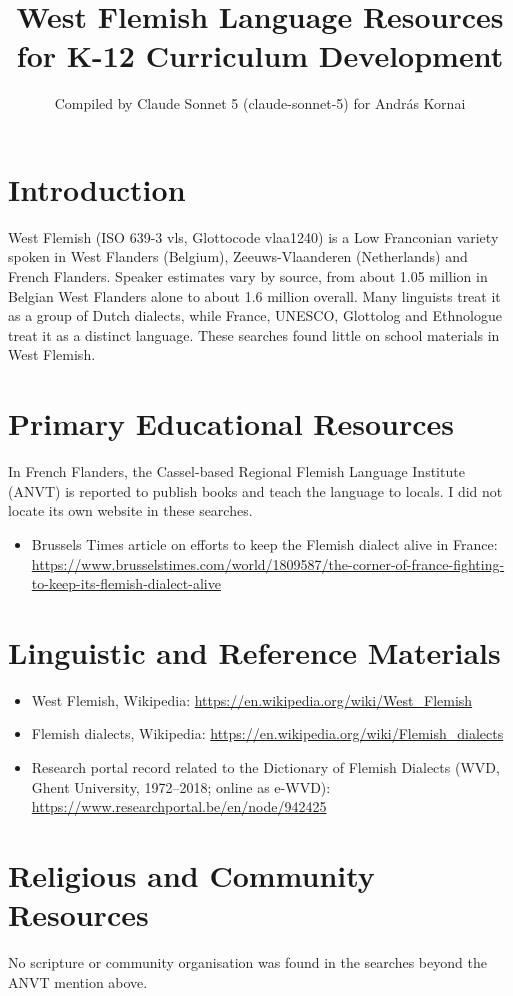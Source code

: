 \documentclass[12pt]{article}
\title{West Flemish Language Resources for K-12 Curriculum Development}
\author{Compiled by Claude Sonnet 5 (claude-sonnet-5) for Andr\'as Kornai}
\date{}
\begin{document}
\maketitle

\section{Introduction}
West Flemish (ISO 639-3 vls, Glottocode vlaa1240) is a Low Franconian variety spoken in West Flanders (Belgium), Zeeuws-Vlaanderen (Netherlands) and French Flanders. Speaker estimates vary by source, from about 1.05 million in Belgian West Flanders alone to about 1.6 million overall. Many linguists treat it as a group of Dutch dialects, while France, UNESCO, Glottolog and Ethnologue treat it as a distinct language. These searches found little on school materials in West Flemish.

\section{Primary Educational Resources}
In French Flanders, the Cassel-based Regional Flemish Language Institute (ANVT) is reported to publish books and teach the language to locals. I did not locate its own website in these searches.
\begin{itemize}
\item Brussels Times article on efforts to keep the Flemish dialect alive in France: \url{https://www.brusselstimes.com/world/1809587/the-corner-of-france-fighting-to-keep-its-flemish-dialect-alive}
\end{itemize}

\section{Linguistic and Reference Materials}
\begin{itemize}
\item West Flemish, Wikipedia: \url{https://en.wikipedia.org/wiki/West_Flemish}
\item Flemish dialects, Wikipedia: \url{https://en.wikipedia.org/wiki/Flemish_dialects}
\item Research portal record related to the Dictionary of Flemish Dialects (WVD, Ghent University, 1972--2018; online as e-WVD): \url{https://www.researchportal.be/en/node/942425}
\end{itemize}

\section{Religious and Community Resources}
No scripture or community organisation was found in the searches beyond the ANVT mention above.
\end{document}
